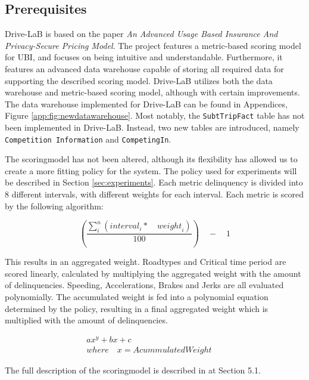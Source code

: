 \subsection{Prerequisites}\label{subsec:prereq}
Drive-LaB is based on the paper \textit{An Advanced Usage Based Insurance And Privacy-Secure Pricing Model}\citep{sw9_report}. The project features a metric-based scoring model for UBI, and focuses on being intuitive and understandable. Furthermore, it features an advanced data warehouse capable of storing all required data for supporting the described scoring model. Drive-LaB utilizes both the data warehouse and metric-based scoring model, although with certain improvements. The data warehouse implemented for Drive-LaB can be found in Appendices, Figure \ref{app:fig:newdatawarehouse}. Most notably, the \texttt{SubtTripFact} table has not been implemented in Drive-LaB. Instead, two new tables are introduced, namely \texttt{Competition Information} and \texttt{CompetingIn}.

The scoringmodel has not been altered, although its flexibility has allowed us to create a more fitting policy for the system. The policy used for experiments will be described in Section \ref{sec:experiments}. Each metric delinquency is divided into 8 different intervals, with different weights for each interval. Each metric is scored by the following algorithm:

$$
\left( \frac { \sum _{ i }^{ n }{ \left( { interval }_{ i }*\quad { weight }_{ i } \right)  }  }{ 100 }  \right) \quad -\quad 1
$$

This results in an aggregated weight. Roadtypes and Critical time period are scored linearly, calculated by multiplying the aggregated weight with the amount of delinquencies. Speeding, Accelerations, Brakes and Jerks are all evaluated polynomially. The accumulated weight is fed into a polynomial equation determined by the policy, resulting in a final aggregated weight which is multiplied with the amount of delinquencies.

\begin{align*}
ax^{y} + bx + c\quad \quad \quad \quad \quad \quad \quad \quad \quad \quad \quad \\
where\quad x = AcummulatedWeight
\end{align*}

The full description of the scoringmodel is described in \citep{sw9_report} at Section 5.1.